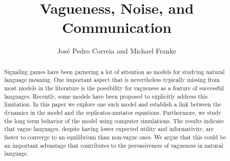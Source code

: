 \documentclass[fleqn,reqno,10pt]{article}
\title{Vagueness, Noise, and Communication}
\author{Jos\'e Pedro Correia and Michael Franke}
\date{}
\begin{document}
\maketitle

\begin{abstract}
  Signaling games have been garnering a lot of attention as models for
  studying natural language meaning.  One important aspect that is
  nevertheless typically missing from most models in the literature is
  the possibility for vagueness as a feature of successful languages.
  Recently, some models have been proposed to explicitly address this
  limitation.  In this paper we explore one such model and establish a
  link between the dynamics in the model and the replicator-mutator
  equations.  Furthermore, we study the long term behavior of the
  model using computer simulations.  The results indicate that vague
  languages, despite having lower expected utility and informativity,
  are faster to converge to an equilibrium than non-vague ones.  We
  argue that this could be an important advantage that contributes to
  the pervasiveness of vagueness in natural language.
\end{abstract}














\printbibliography[heading=bibintoc]
\end{document}
